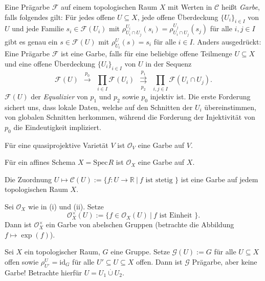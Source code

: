 \documentclass[11pt]{book}
\theoremstyle{nonumberbreak}
\newenvironment{defin}[1][]{\ifthenelse{\equal{#1}{}}{\definition}{\definition[#1]}\rm}{\enddefinition}
\newenvironment{ex}[1][]{\ifthenelse{\equal{#1}{}}{\example}{\example[#1]}\rm}{\endexample}
\newcommand{\spec}{\mathrm{Spec} \hspace{1pt} }
\begin{document}
\begin{spacing}{1.4}
\begin{defin}   %
Eine Prägarbe $\mathcal{F}$ auf einem topologischen Raum $X$ mit Werten in $\mathcal{C}$ heißt \textit{Garbe}, falls folgendes gilt: Für jedes offene $U \subseteq X$, jede offene Überdeckung $\{U_i\}_{i \in I}$ von $U$ und jede Familie $s_i \in \mathcal{F}(U_i)$ mit $\rho^{U_i}_{U_i \cap U_j}(s_i) = \rho^{U_j}_{U_i \cap U_j} (s_j)$ für alle $i,j \in I$ gibt es genau ein $s \in \mathcal{F}(U)$ mit $\rho^{U}_{U_i}(s) = s_i$ für alle $i \in I$.
Anders ausgedrückt: Eine Prägarbe $\mathcal{F}$ ist eine Garbe, falls für eine beliebige offene Teilmenge $U \subseteq X$ und eine offene Überdeckung $\{U_i \}_{i \in I}$ von $U$ in der Sequenz
$$\mathcal{F}(U) \ \  \overset{p_0}{\longrightarrow} \ \  \prod_{i \in I} \mathcal{F}(U_i) \ \ \underset{p_2}{\overset{p_1}{\rightrightarrows}} \ \ \prod_{i,j \in I} \mathcal{F}(U_i \cap U_j).$$
$\mathcal{F}(U)$ der \textit{Equalizier} von $p_1$ und $p_2$ sowie $p_0$ injektiv ist. Die erste Forderung sichert uns, dass lokale Daten, welche auf den Schnitten der $U_i$ übereinstimmen, von globalen Schnitten herkommen, während die Forderung der Injektivität von $p_0$ die Eindeutigkeit impliziert.
\end{defin}

\begin{ex}   %
\begin{compactenum}
\item Für eine quasiprojektive Varietät $V$ ist $\mathcal{O}_V$ eine Garbe auf $V$.
\item Für ein affines Schema $X=\spec R$ ist $\mathcal{O}_X$ eine Garbe auf $X$.
\item Die Zuordnung $U \mapsto \mathcal{C}(U) := \{f: U \longrightarrow \mathbb{R} \ \vert \ f \textrm{ ist stetig } \}$ ist eine Garbe auf jedem topologischen Raum $X$.
\item Sei $\mathcal{O}_X$ wie in (i) und (ii). Setze
$$\mathcal{O}_X^{\times}(U) := \{ f \in \mathcal{O}_X(U) \ \vert \ f \textrm{ ist Einheit } \}.$$
Dann ist $\mathcal{O}_X^{\times}$ ein Garbe von abelschen Gruppen (betrachte die Abbildung $f \mapsto \exp(f)$).
\item Sei $X$ ein topologischer Raum, $G$ eine Gruppe. Setze $\mathcal{G}(U) := G$ für alle $U \subseteq X$ offen sowie $\rho^{U}_{U'} = \textrm{id}_G$ für alle $U' \subseteq U \subseteq X$ offen. Dann ist $\mathcal{G}$ Prägarbe, aber keine Garbe! Betrachte hierfür $U= U_1 \overset{.}{\cup} U_2$.
\end{compactenum}
\end{ex}


\end{spacing}
\end{document}
